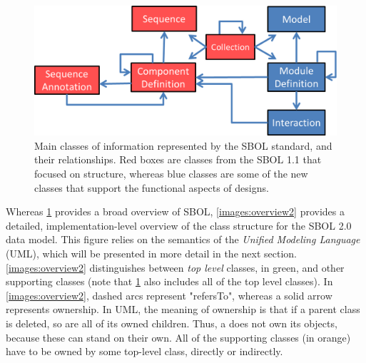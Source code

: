 \begin{figure}[ht]
\begin{center}
\includegraphics[scale=0.7]{images/OverviewFigforSpec-v7.png}
\caption{Main classes of information represented by the SBOL standard, and their relationships.  Red boxes are classes from the SBOL 1.1 that focused on structure, whereas blue classes are some of the new classes that support the functional aspects of designs.}
\label{images:overview1}
\end{center}
\end{figure}

Whereas \ref{images:overview1} provides a broad overview of SBOL, \ref{images:overview2} provides a detailed, implementation-level overview of the class structure for the SBOL 2.0 data model. This figure relies on the semantics of the \emph{Unified Modeling Language} (UML), which will be presented in more detail in the next section. \ref{images:overview2} distinguishes between \emph{top level} classes, in green, and other supporting classes (note that \ref{images:overview1} also includes all of the top level classes). In \ref{images:overview2}, dashed arcs represent "refersTo", whereas a solid arrow represents ownership. In UML, the meaning of ownership is that if a parent class is deleted, so are all of its owned children. Thus, a  does not own its
 objects, because these can stand on their own. All of the supporting classes (in orange) have to be owned by some top-level class, directly or indirectly. 


